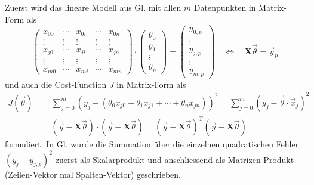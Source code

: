 Zuerst wird das lineare Modell aus Gl.  mit allen
$m$ Datenpunkten in Matrix-Form als
\begin{equation}
    \begin{pmatrix}
        x_{00}& \cdots& x_{0i}& \cdots& x_{0n}\\
        \vdots& \vdots& \vdots& \vdots& \vdots\\
        x_{j0}& \cdots& x_{ji}& \cdots& x_{jn}\\
        \vdots& \vdots& \vdots& \vdots& \vdots\\
        x_{m0}& \cdots& x_{mi}& \cdots& x_{mn}
    \end{pmatrix}
    \cdot
    \begin{pmatrix}
        \theta_0\\ \theta_1 \\ \vdots\\ \theta_n
    \end{pmatrix}
    = \begin{pmatrix}
        y_{0,p}\\ \vdots \\ y_{j,p} \\ \vdots \\ y_{m,p}
    \end{pmatrix}
    \quad \iff \quad
    \mathbf{X} \vec \theta = \vec y_p
    \label{ml:regression:lstsq:modell}
\end{equation}
und auch die Cost-Function $J$ in Matrix-Form als
\begin{align}
    J(\vec \theta) &= \sum_{j=0}^m \left(y_j - (\theta_0 x_{j0} + \theta_1 x_{j1} + \cdots + \theta_n x_{jn}) \right)^2
    = \sum_{j=0}^{m} \left( y_j - \vec \theta \cdot \vec x_j \right)^2 \nonumber\\
    &= \left(\vec y - \mathbf{X} \vec \theta\right) \cdot \left(\vec y - \mathbf{X} \vec \theta\right)
    = \left(\vec y - \mathbf{X} \vec \theta\right)^\mathrm{T} \left(\vec y - \mathbf{X} \vec \theta\right)
    \label{ml:regression:lstsq:cost}
\end{align}
formuliert. In Gl.  wurde die Summation über die
einzelnen quadratischen Fehler $(y_j - y_{j,p})^2$ zuerst als Skalarprodukt und
anschliessend als Matrizen-Produkt (Zeilen-Vektor mal Spalten-Vektor) geschrieben.

